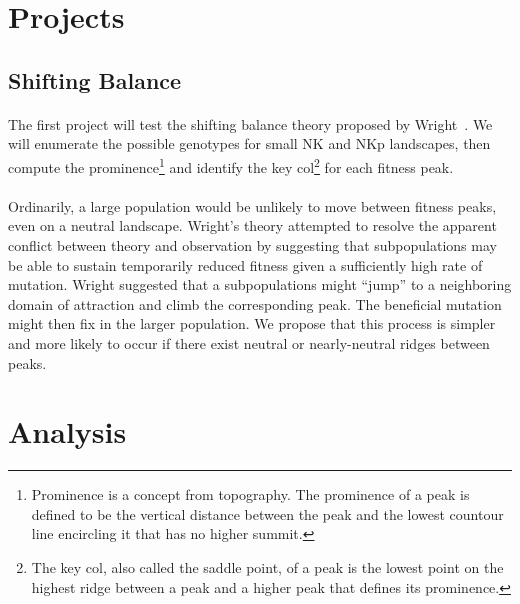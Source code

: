 \documentclass[12pt,letterpaper,titlepage,draft]{article}
\begin{document}
\section*{Projects}

\subsection*{Shifting Balance}

\paragraph{}
The first project will test the shifting balance theory proposed by
Wright~\cite{Wright1982}\cite{Wright1931}. We will enumerate the possible
genotypes for small NK and NKp landscapes, then compute the
prominence\footnote{Prominence is a concept from topography. The prominence of
a peak is defined to be the vertical distance between the peak and the
lowest countour line encircling it that has no higher summit.} and identify the
key col\footnote{The key col, also called the saddle point, of a peak is the
lowest point on the highest ridge between a peak and a higher peak that
defines its prominence.} for each fitness peak.

\paragraph{}
Ordinarily, a large population would be unlikely to move between fitness peaks,
even on a neutral landscape. Wright's theory attempted to resolve the apparent
conflict between theory and observation by suggesting that subpopulations may
be able to sustain temporarily reduced fitness given a sufficiently high rate
of mutation. Wright suggested that a subpopulations might ``jump'' to a
neighboring domain of attraction and climb the corresponding peak. The
beneficial mutation might then fix in the larger population. We propose that
this process is simpler and more likely to occur if there exist neutral or
nearly-neutral ridges between peaks.

\section*{Analysis}

{}

\end{document}
